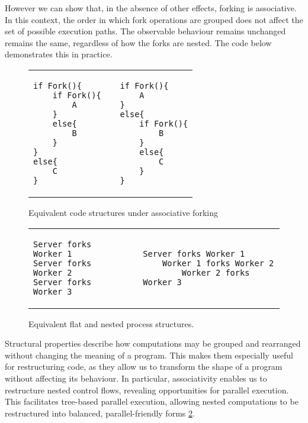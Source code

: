 \documentclass[logo,bsc,singlespacing,parskip]{infthesis}
\begin{document}
However we can show that, in the absence of other effects, forking is associative. In this context, the order in which fork operations are grouped does not affect the set of possible execution paths. The observable behaviour remains unchanged remains the same, regardless of how the forks are nested. The code below demonstrates this in practice.

\vspace{-2em}
\begin{figure}[H]
    \centering


\begin{table}[H]
\centering
\begin{tabular}{p{} c p{}}
\begin{lstlisting}
if Fork(){
    if Fork(){
        A
    }
    else{
        B
    }
}
else{
    C
}
\end{lstlisting}
&
&
\begin{lstlisting}
if Fork(){
    A
} 
else{
    if Fork(){
        B
    }
    else{
        C
    }
}
\end{lstlisting}
\end{tabular}
\end{table}
\vspace{-2em}

    \caption{Equivalent code structures under associative forking}
    \label{fig:enter-label}
\end{figure}


\vspace{-1em} %
\begin{figure}[H]
    \centering
    \begin{tabular}{p{} c p{}}
        \begin{lstlisting}
Server forks Worker 1
Server forks Worker 2
Server forks Worker 3
        \end{lstlisting}
        &
        &
        \begin{lstlisting}
Server forks Worker 1
    Worker 1 forks Worker 2
        Worker 2 forks Worker 3
        \end{lstlisting}
    \end{tabular}
    \vspace{-1em} %

    \caption{Equivalent flat and nested process structures.}
    \label{fig:process-restructuring}
\end{figure}

Structural properties describe how computations may be grouped and rearranged without changing the meaning of a program. This makes them especially useful for restructuring code, as they allow us to transform the shape of a program without affecting its behaviour. In particular, associativity enables us to restructure nested control flows, revealing opportunities for parallel execution. This facilitates tree-based parallel execution, allowing nested computations to be restructured into balanced, parallel-friendly forms \ref{fig:process-restructuring}.
\end{document}
